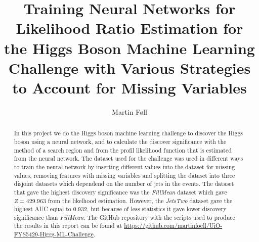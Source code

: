 \documentclass[aps,rmp,reprint,amsmath,amssymb,graphicx,longbibliography]{revtex4-1}
\begin{document}

\title{Training Neural Networks for Likelihood Ratio Estimation for the Higgs Boson Machine Learning Challenge with Various Strategies to Account for Missing Variables}

\author{Martin Føll}


\begin{abstract}
  In this project we do the Higgs boson machine learning challenge \cite{pmlr-v42-cowa14} to discover the Higgs boson using a neural network, and to calculate the discover significance with the method of a search region and from the profil likelihood function that is estimated from the neural network. The dataset used for the challenge was used in different ways to train the neural network by inserting different values into the dataset for missing values, removing features with missing variables and splitting the dataset into three disjoint datasets which dependend on the number of jets in the events. The dataset that gave the highest discovery significance was the \emph{FillMean} dataset which gave \(Z=429.963\) from the likelhood estimation. However, the \emph{JetsTwo} dataset gave the highest AUC equal to 0.932, but because of less statistics it gave lower discovery significance than \emph{FillMean}. The GitHub repository with the scripts used to produce the results in this report can be found at \url{https://github.com/martinfoell/UiO-FYS5429-Higgs-ML-Challenge}.
\end{abstract}

\maketitle

\tableofcontents






\end{document}
